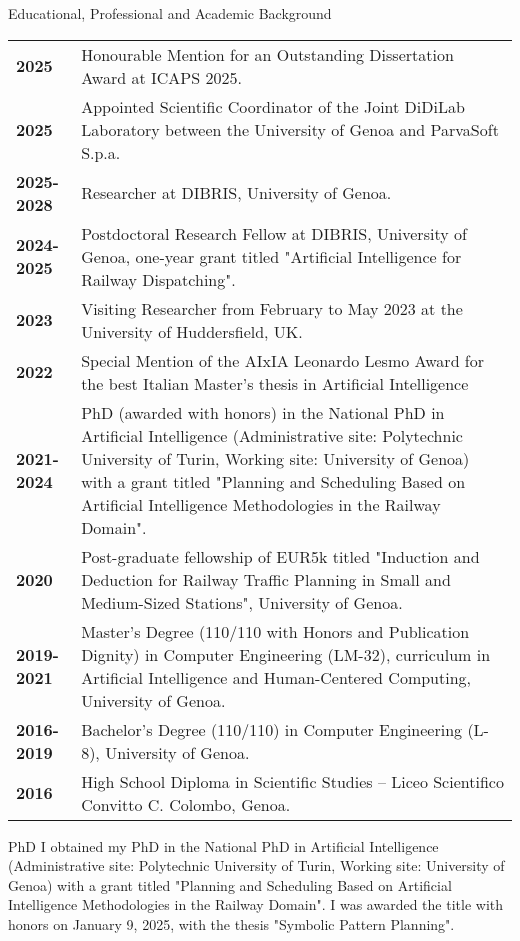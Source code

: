 \documentclass{resume} %
\begin{document}

\begin{rSection}{Educational, Professional and Academic Background}

\begin{tabularx}{0.95\textwidth} {lp{14cm}}
	\textbf{2025} & Honourable Mention for an Outstanding Dissertation Award at ICAPS 2025.\\
 \textbf{2025} & Appointed Scientific Coordinator of the Joint DiDiLab Laboratory between the University of Genoa and ParvaSoft S.p.a.  \\
 \textbf{2025-2028} & Researcher at DIBRIS, University of Genoa.  \\
 \textbf{2024-2025} & Postdoctoral Research Fellow at DIBRIS, University of Genoa, one-year grant titled "Artificial Intelligence for Railway Dispatching".  \\
 \textbf{2023}  & Visiting Researcher from February to May 2023 at the University of Huddersfield, UK.\\
  \textbf{2022}  & Special Mention of the AIxIA Leonardo Lesmo Award for the best Italian Master's thesis in Artificial Intelligence\\
 \textbf{2021-2024}  & PhD (awarded with honors) in the National PhD in Artificial Intelligence (Administrative site: Polytechnic University of Turin, Working site: University of Genoa) with a grant titled "Planning and Scheduling Based on Artificial Intelligence Methodologies in the Railway Domain".\\
 \textbf{2020} & Post-graduate fellowship of EUR5k titled "Induction and Deduction for Railway Traffic Planning in Small and Medium-Sized Stations", University of Genoa. \\
 \textbf{2019-2021}  & Master’s Degree (110/110 with Honors and Publication Dignity) in Computer Engineering (LM-32), curriculum in Artificial Intelligence and Human-Centered Computing, University of Genoa.  \\
 \textbf{2016-2019}  & Bachelor’s Degree (110/110) in Computer Engineering (L-8), University of Genoa. \\
 \textbf{2016}  & High School Diploma in Scientific Studies – Liceo Scientifico Convitto C. Colombo, Genoa. 
\end{tabularx}
\end{rSection}
\begin{rSection}{PhD}
	I obtained my PhD in the National PhD in Artificial Intelligence (Administrative site: Polytechnic University of Turin, Working site: University of Genoa) with a grant titled "Planning and Scheduling Based on Artificial Intelligence Methodologies in the Railway Domain". I was awarded the title with honors on January 9, 2025, with the thesis "Symbolic Pattern Planning".
\end{rSection}
\end{document}
